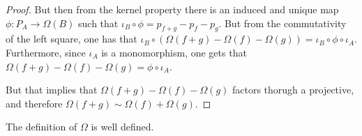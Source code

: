 \begin{proof}
    But then from the kernel property there is an induced and unique map \( \phi: P_A \to \Omega(B) \) such that \( \iota_B \circ \phi = p_{f + g} - p_f - p_g \). But from the commutativity of the left square, one has that \( \iota_B \circ (\Omega(f+g)-\Omega(f)-\Omega(g)) = \iota_B \circ \phi \circ \iota_A \). Furthermore, since \( \iota_A \) is a monomorphism, one gets that \( \Omega(f+g)-\Omega(f)-\Omega(g) = \phi \circ \iota_A \).

    But that implies that \( \Omega(f+g)-\Omega(f)-\Omega(g) \) factors thorugh a projective, and therefore \( \Omega(f + g) \sim \Omega(f) + \Omega(g) \).
\end{proof}

\begin{lemma}
    The definition of \( \Omega \) is well defined.
\end{lemma}
